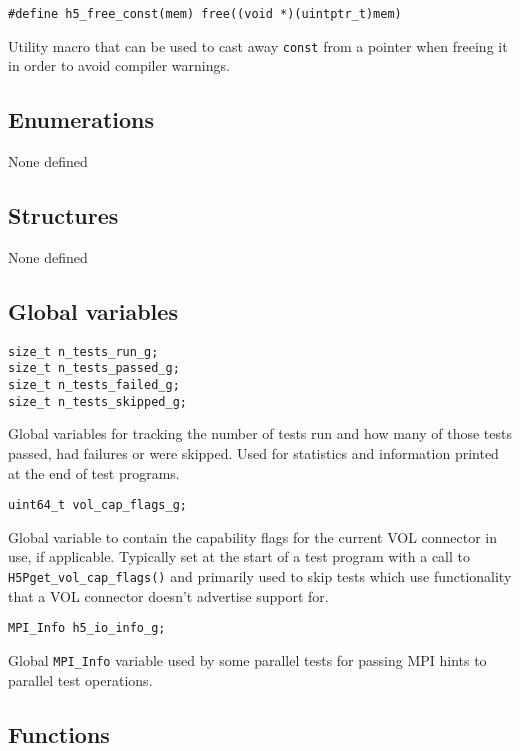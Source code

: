 \documentclass[../HDF5_RFC.tex]{subfiles}
\begin{document}
\begin{verbatim}
#define h5_free_const(mem) free((void *)(uintptr_t)mem)
\end{verbatim}

Utility macro that can be used to cast away \texttt{const} from a pointer when freeing it in
order to avoid compiler warnings.

\subsection{Enumerations}

None defined

\subsection{Structures}

None defined

\subsection{Global variables}

\begin{verbatim}
size_t n_tests_run_g;
size_t n_tests_passed_g;
size_t n_tests_failed_g;
size_t n_tests_skipped_g;
\end{verbatim}

Global variables for tracking the number of tests run and how many of those tests passed, had 
failures or were skipped. Used for statistics and information printed at the end of test programs.

\begin{verbatim}
uint64_t vol_cap_flags_g;
\end{verbatim}

Global variable to contain the capability flags for the current VOL connector in use, if applicable.
Typically set at the start of a test program with a call to \texttt{H5Pget\_vol\_cap\_flags()} and
primarily used to skip tests which use functionality that a VOL connector doesn't advertise support
for.

\begin{verbatim}
MPI_Info h5_io_info_g;
\end{verbatim}

Global \texttt{MPI\_Info} variable used by some parallel tests for passing MPI hints to parallel
test operations.

\subsection{Functions}
\end{document}
